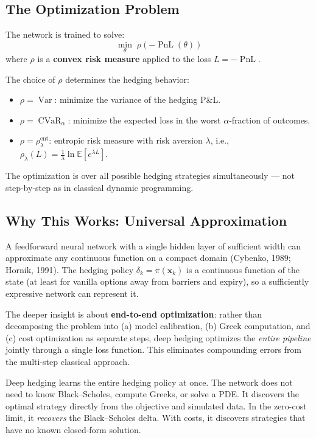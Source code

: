 \documentclass[11pt, a4paper]{article}
\theoremstyle{definition}
\theoremstyle{plain}
\theoremstyle{remark}
\newcommand{\CVaR}{\operatorname{CVaR}}
\newcommand{\EV}{\mathbb{E}}
\newcommand{\PnL}{\operatorname{PnL}}
\begin{document}
\subsection{The Optimization Problem}

The network is trained to solve:
\[
    \min_\theta \; \rho\!\left(-\PnL(\theta)\right)
\]
where $\rho$ is a \textbf{convex risk measure} applied to the loss $L = -\PnL$.

\begin{keyidea}
The choice of $\rho$ determines the hedging behavior:
\begin{itemize}
    \item $\rho = \operatorname{Var}$: minimize the variance of the hedging P\&L.
    \item $\rho = \CVaR_\alpha$: minimize the expected loss in the worst $\alpha$-fraction of outcomes.
    \item $\rho = \rho_\lambda^{\text{ent}}$: entropic risk measure with risk aversion $\lambda$,
          i.e., $\rho_\lambda(L) = \frac{1}{\lambda}\ln \EV[e^{\lambda L}]$.
\end{itemize}
The optimization is over all possible hedging strategies simultaneously ---
not step-by-step as in classical dynamic programming.
\end{keyidea}

\subsection{Why This Works: Universal Approximation}

A feedforward neural network with a single hidden layer of sufficient width
can approximate any continuous function on a compact domain (Cybenko, 1989; Hornik, 1991).
The hedging policy $\delta_k = \pi(\bm{x}_k)$ is a continuous function of the state
(at least for vanilla options away from barriers and expiry),
so a sufficiently expressive network can represent it.

The deeper insight is about \textbf{end-to-end optimization}:
rather than decomposing the problem into (a) model calibration,
(b) Greek computation, and (c) cost optimization as separate steps,
deep hedging optimizes the \emph{entire pipeline} jointly through a single loss function.
This eliminates compounding errors from the multi-step classical approach.

\begin{keyresult}
Deep hedging learns the entire hedging policy at once.
The network does not need to know Black--Scholes, compute Greeks, or solve a PDE.
It discovers the optimal strategy directly from the objective and simulated data.
In the zero-cost limit, it \emph{recovers} the Black--Scholes delta.
With costs, it discovers strategies that have no known closed-form solution.
\end{keyresult}
\end{document}
